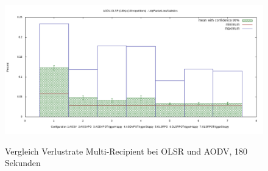\begin{figure}
  \centering
  \includegraphics[scale=0.5]{bilder/c3.png} \\
  \caption{Vergleich Verlustrate Multi-Recipient bei OLSR und AODV, 180 Sekunden}
  \label{image:omnet:olsr:comp3}
\end{figure}